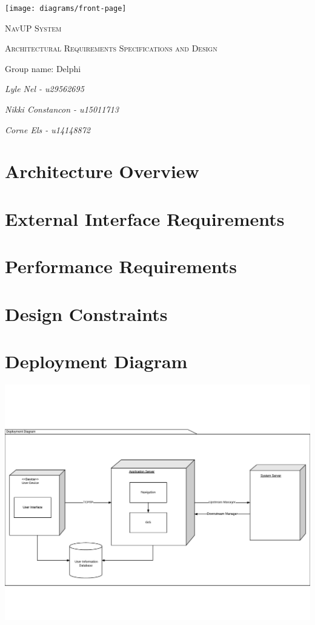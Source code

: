 \documentclass{article}
\begin{document}
\begin{titlepage}
	\centering
	\texttt{[image: diagrams/front-page]}
	\vfill
	{\scshape\LARGE NavUP System\par}
	\vfill
	{\scshape\Large Architectural Requirements Specifications and Design\par}
	\vfill
	{\Large Group name: Delphi\par}
	\bigskip 
	{\itshape\Large Lyle Nel - u29562695\par}
	{\itshape\Large Nikki Constancon - u15011713\par}
	{\itshape\Large Corne Els - u14148872\par}	
	\vfill
\end{titlepage}

\tableofcontents

\clearpage

\section{Architecture Overview}


\section{External Interface Requirements}


\section{Performance Requirements}


\section{Design Constraints}


\section{Deployment Diagram}
\includegraphics[width=\textwidth]{diagrams/Deployment_attempt}
\end{document}
